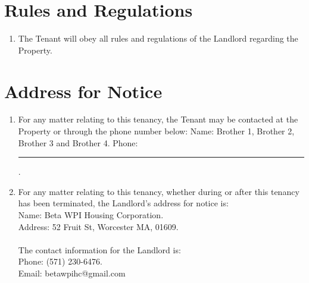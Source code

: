 \documentclass[12pt]{article}
\begin{document}
\section*{Rules and Regulations}
\begin{enumerate}[resume]
    \item The Tenant will obey all rules and regulations of the Landlord
	    regarding the Property.
\end{enumerate}
    
\section*{Address for Notice}
\begin{enumerate}[resume]
    \item For any matter relating to this tenancy, the Tenant may be contacted
	    at the Property or through the phone number below:
	Name: Brother 1, Brother 2, Brother 3 and Brother 4.
	Phone: \rule{3cm}{0.15mm}.
    \item For any matter relating to this tenancy, whether during or after this tenancy has been terminated, the Landlord's address for notice is:\\
        Name: Beta WPI Housing Corporation.\\
        Address: 52 Fruit St, Worcester MA, 01609.\\\\
        The contact information for the Landlord is:\\
        Phone:  (571) 230-6476.\\
        Email: betawpihc@gmail.com
\end{enumerate}
        
\end{document}
